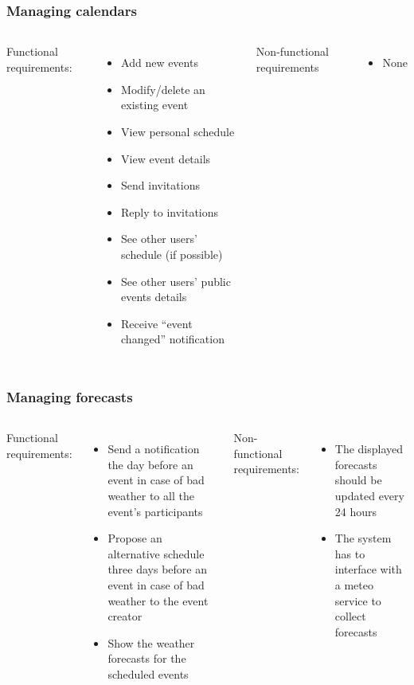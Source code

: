 \documentclass[professionalfonts]{beamer}
\begin{document}
\begin{frame}
\frametitle{Managing calendars}
\begin{columns}[c]
Functional requirements:
\begin{itemize}
\item Add new events
\item Modify/delete an existing event
\item View personal schedule
\item View event details
\item Send invitations
\item Reply to invitations
\item See other users' schedule (if possible)
\item See other users' public events details
\item Receive ``event changed'' notification
\end{itemize}
Non-functional requirements
\begin{itemize}
\item None
\end{itemize}
\end{columns}
\end{frame}

\begin{frame}
\frametitle{Managing forecasts}
\begin{columns}[c]
Functional requirements:
\begin{itemize}
\item Send a notification the day before an event in case of bad weather to all the event's participants
\item Propose an alternative schedule three days before an event in case of bad weather to the event creator
\item Show the weather forecasts for the scheduled events
\end{itemize}
Non-functional requirements:
\begin{itemize}
\item The displayed forecasts should be updated every 24 hours
\item The system has to interface with a meteo service to collect forecasts
\end{itemize}
\end{columns}
\end{frame}
\end{document}
